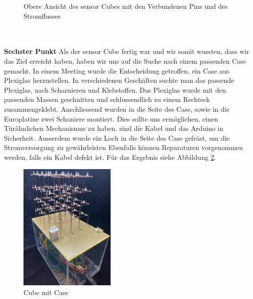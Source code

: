 \documentclass{article}
\begin{document}
\begin{figure}[hbt!]
\caption{Obere Ansicht des sensor Cubes mit den Verbundenen Pins und des Stromflusses}
\label{fig:kathodepins}
\end{figure} \\ \\
\textbf{Sechster Punkt} Als der sensor Cube fertig war und wir somit wussten, dass wir das Ziel erreicht haben, haben wir uns auf die Suche nach einem passenden Case gemacht. In einem Meeting wurde die Entscheidung getroffen, ein Case aus Plexiglas herzustellen. In verschiedenen Geschäften suchte man das passende Plexiglas, nach Scharnieren und Klebstoffen. Das Plexiglas wurde mit den passenden Massen geschnitten und schlussendlich zu einem Rechteck zusammengeklebt. Anschliessend wurden in die Seite des Case, sowie in die Europlatine zwei Schaniere montiert. Dies sollte uns ermöglichen, einen Türähnlichen Mechanismus zu haben. sind die Kabel und das Arduino in Sicherheit. Ausserdem wurde ein Loch in die Seite des Case gefräst, um die Stromversorgung zu gewährleisten Ebenfalls können Reparaturen vorgenommen werden, falls ein Kabel defekt ist. Für das Ergebnis siehe Abbildung \ref{fig:cubewcase}.
\begin{figure}[!h]
\begin{center}
\includegraphics[width=0.42\textwidth]{bilder/cubewcase.jpeg}
\caption{Cube mit Case}
\label{fig:cubewcase}
\end{center}
\end{figure}
\newpage
\end{document}

